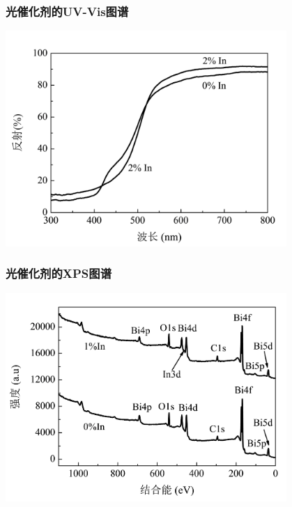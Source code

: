 \documentclass[xetex,compress]{mybeamer}
\begin{document}
\begin{frame}
\frametitle{光催化剂的UV-Vis图谱}
\begin{block}{}
\centering
\includegraphics[width=0.8\textwidth]{figures/三氧化二铟UV.jpg} 
\end{block}
\end{frame}

\begin{frame}
\frametitle{光催化剂的XPS图谱}
\begin{block}{}
\centering
\includegraphics[width=0.8\textwidth]{figures/三氧化二铟XPS.jpg} 
\end{block}
\end{frame}
\end{document}
